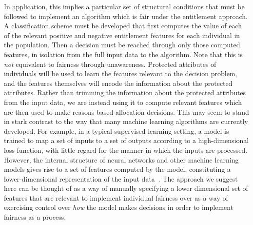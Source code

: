 In application, this implies a particular set of structural conditions that must
be followed to implement an algorithm which is fair under the entitlement
approach. A classification scheme must be developed that first computes the
value of each of the relevant positive and negative entitlement features for
each individual in the population. Then a decision must be reached through only
those computed features, in isolation from the full input data to the algorithm.
Note that this is \emph{not} equivalent to fairness through unawareness.
Protected attributes of individuals will be used to learn the features relevant
to the decision problem, and the features themselves will encode the information
about the protected attributes. Rather than trimming the information about the
protected attributes from the input data, we are instead using it to compute 
relevant features which are then used to make reasons-based allocation decisions.
This may seem to stand in stark contrast to the way that many machine learning
algorithms are currently developed. For example, in a typical supervised
learning setting, a model is trained to map a set of inputs to a set of outputs
according to a high-dimensional loss function, with little regard for the
manner in which the inputs are processed. However, the internal structure of
neural networks and other machine learning models gives rise to a set of
features computed by the model, constituting a lower-dimensional representation
of the input data~\citep{Liu_2018}. The approach we suggest here can be thought
of as a way of manually specifying a lower dimensional set of features that
are relevant to implement individual fairness over as a way of
exercising control over \emph{how} the model makes decisions in order to
implement fairness as a process.

